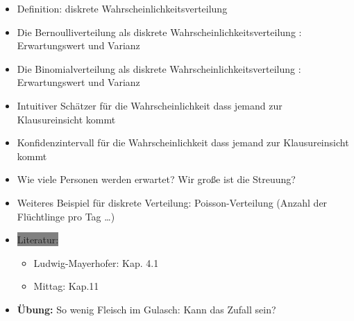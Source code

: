 \documentclass[a4paper,fontsize=16pt]{article}
\begin{document}
\begin{enumerate}
{       \begin{itemize}
       \item{Definition: diskrete Wahrscheinlichkeitsverteilung}
       \item{Die Bernoulliverteilung als  diskrete Wahrscheinlichkeitsverteilung : Erwartungswert und Varianz}
         \item{Die Binomialverteilung als diskrete Wahrscheinlichkeitsverteilung : Erwartungswert und Varianz}
         \item{Intuitiver Schätzer für die Wahrscheinlichkeit dass jemand zur Klausureinsicht kommt}
         \item{Konfidenzintervall für die Wahrscheinlichkeit dass jemand zur Klausureinsicht kommt}
         \item{Wie viele Personen werden erwartet? Wir große ist die Streuung?}
         \item{Weiteres Beispiel für diskrete Verteilung: Poisson-Verteilung (Anzahl der Flüchtlinge pro Tag \dots)}
          \item{\colorbox{gray}{Literatur:} 
       \begin{itemize}
       \item{ Ludwig-Mayerhofer: Kap. 4.1 }
       \item{Mittag: Kap.11}
       \end{itemize}}
         \item{\textbf{Übung:} So wenig Fleisch im Gulasch: Kann das Zufall sein?}
         \end{itemize}
      } 
 
   

\end{enumerate}
\end{document}
